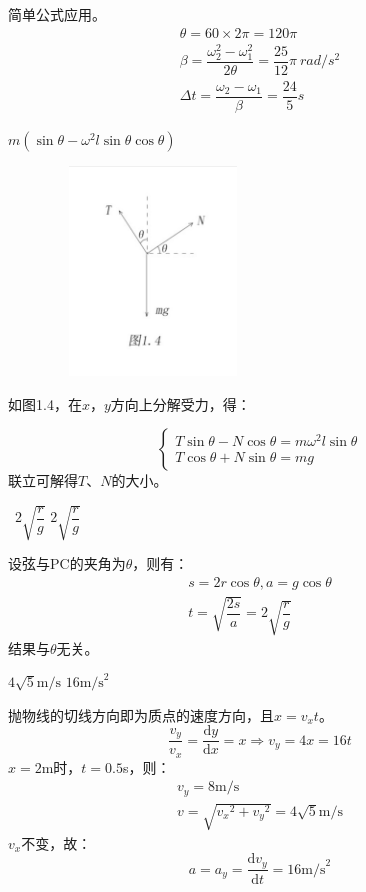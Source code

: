 \documentclass[b5paper,opensource,sourcefont,parskip]{qyxf-book}
\newcommand{\di}[1]{\mathrm{d}#1}
\newcommand{\dy}[2]{\frac{\di{#1}}{\di{#2}}}
\begin{document}
\solve 简单公式应用。
\begin{gather*}
\text{}\theta=60\times2\pi=120\pi\\
\beta=\dfrac{\omega_2^2-\omega_1^2}{2\theta}=\dfrac{25}{12}\pi\ rad/s^2\\
\Delta t=\dfrac{\omega_2-\omega_1}{\beta}=\dfrac{24}{5}s
\end{gather*}

$m(\sin\theta-\omega^2l\sin\theta\cos\theta)$

\begin{figure}[!htbp]
	\centering
	\includegraphics[width=15em, height=15em]{Chp1_illus4.png}
	\label{fig:c1}
\end{figure}

\solve 如图1.4，在$x$，$y$方向上分解受力，得：

\[\begin{cases}
T\sin\theta-N\cos\theta=m\omega^2l\sin\theta\\
T\cos\theta+N\sin\theta=mg
\end{cases}
\]
联立可解得$T$、$N$的大小。

\ $2\sqrt{\dfrac{r}{g}}$ \qquad $2\sqrt{\dfrac{r}{g}}$

\solve 
设弦与PC的夹角为$\theta$，则有：
\begin{gather*}
s=2r\cos\theta,a=g\cos\theta\\
t=\sqrt{\dfrac{2s}{a}}=2\sqrt{\dfrac{r}{g}}
\end{gather*}
结果与$\theta$无关。


$4\sqrt{5}\textrm{m/s}$ \qquad $16\textrm{m/s}^2$

\solve 抛物线的切线方向即为质点的速度方向，且$x=v_xt$。
\[
\dfrac{v_y}{v_x}=\dy{y}{x}=x\Rightarrow v_y=4x=16t
\]
$x=2$m时，$t=0.5$s，则：
\begin{gather*}
v_y=8\textrm{m/s}\\
v=\sqrt{{v_x}^2+{v_y}^2}=4\sqrt{5}\mathrm{m/s}
\end{gather*}
$v_x$不变，故：
\[
a=a_y=\dy{v_y}{t}=16\textrm{m/s}^2
\]
\end{document}
